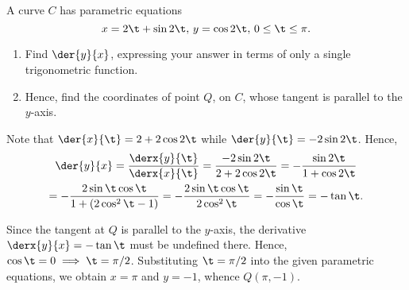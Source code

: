 \begin{problem}
    A curve $C$ has parametric equations \[x = 2\t + \sin 2\t, \, y = \cos 2\t, \, 0 \leq \t \leq \pi.\]

    \begin{enumerate}
        \item Find $\der{y}{x}$, expressing your answer in terms of only a single trigonometric function.
        \item Hence, find the coordinates of point $Q$, on $C$, whose tangent is parallel to the $y$-axis.
    \end{enumerate}
\end{problem}
\begin{solution}
    \begin{ppart}
        Note that $\der{x}{\t} = 2 + 2\cos 2\t$ while $\der{y}{\t} = -2\sin 2\t$. Hence,
        \begin{gather*}
            \der{y}{x} = \frac{\derx{y}{\t}}{\derx{x}{\t}} = \frac{-2\sin 2\t}{2 + 2\cos2\t} = -\frac{\sin 2\t}{1 + \cos2\t} \\
            = -\frac{2\sin\t\cos\t}{1 + (2\cos^2\t - 1)} = -\frac{2\sin\t\cos\t}{2\cos^2\t} = -\frac{\sin\t}{\cos\t} = -\tan\t.
        \end{gather*}
    \end{ppart}
    \begin{ppart}
        Since the tangent at $Q$ is parallel to the $y$-axis, the derivative $\derx{y}{x} = -\tan\t$ must be undefined there. Hence, $\cos \t = 0 \implies \t = \pi/2$. Substituting $\t = \pi/2$ into the given parametric equations, we obtain $x = \pi$ and $y = -1$, whence $Q(\pi, -1)$.
    \end{ppart}
\end{solution}

